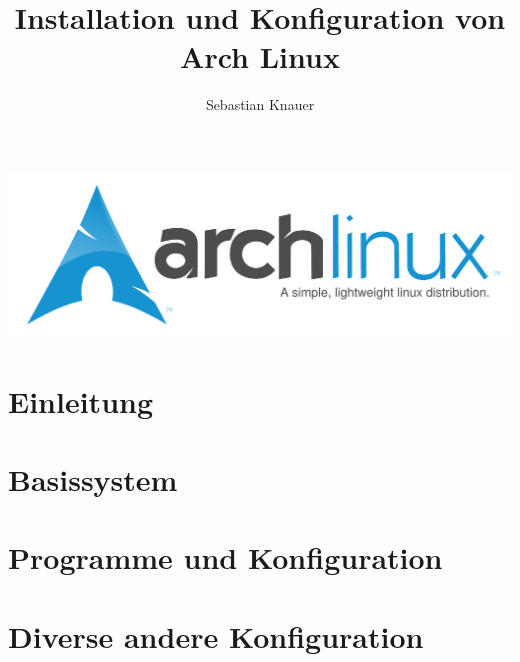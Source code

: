 \documentclass[11pt]{scrartcl}
\author{Sebastian Knauer}
\title{Installation und Konfiguration von Arch Linux}
\begin{document}
\maketitle
\includegraphics[scale=0.75]{arch-logo.pdf}

\section{Einleitung}
\label{sec:einleitung}


\section{Basissystem}
\label{sec:base-system}

    
\section{Programme und Konfiguration}
\label{sec:programme}


\section{Diverse andere Konfiguration}
\label{sec:config}

\end{document}
